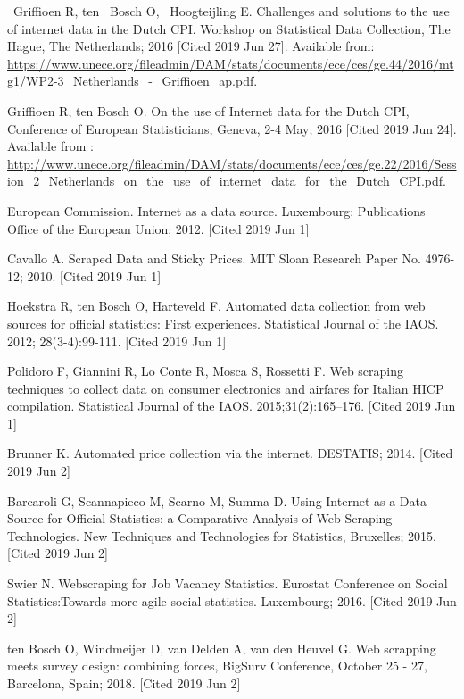 \documentclass[]{article}
\begin{document}
\begin{thebibliography}{99}
~Griffioen R, ten ~Bosch O, ~Hoogteijling E. Challenges and solutions to the use of internet data in the Dutch CPI. 
Workshop on Statistical Data Collection, The Hague, The Netherlands; 2016 [Cited 2019 Jun 27]. Available from: \url{https://www.unece.org/fileadmin/DAM/stats/documents/ece/ces/ge.44/2016/mtg1/WP2-3_Netherlands_-_Griffioen_ap.pdf}.

Griffioen R, ten Bosch O. On the use of Internet data for the Dutch CPI,
Conference of European Statisticians, Geneva, 2-4 May; 2016 [Cited 2019 Jun 24]. Available from : \url{http://www.unece.org/fileadmin/DAM/stats/documents/ece/ces/ge.22/2016/Session_2_Netherlands_on_the_use_of_internet_data_for_the_Dutch_CPI.pdf}.

European Commission. Internet as a data source. Luxembourg: Publications Office of the European Union; 2012. [Cited 2019 Jun 1]

Cavallo A. Scraped Data and Sticky Prices. MIT Sloan Research Paper No. 4976-12; 2010. [Cited 2019 Jun 1]

Hoekstra R, ten Bosch O, Harteveld F. Automated data collection from web sources for official statistics: First experiences. 
Statistical Journal of the IAOS. 2012; 28(3-4):99-111. [Cited 2019 Jun 1]

Polidoro F, Giannini R, Lo Conte R, Mosca S, Rossetti F. Web scraping techniques to collect data on consumer electronics and airfares for Italian HICP compilation. Statistical Journal of the IAOS. 2015;31(2):165–176. [Cited 2019 Jun 1]

Brunner K. Automated price collection via the internet. DESTATIS; 2014. [Cited 2019 Jun 2]

Barcaroli G, Scannapieco M, Scarno M, Summa D. Using Internet as a Data Source for Official Statistics: a Comparative Analysis of Web Scraping Technologies.
New Techniques and Technologies for Statistics, Bruxelles; 2015. [Cited 2019 Jun 2]

Swier N. Webscraping for Job Vacancy Statistics. Eurostat Conference on Social Statistics:Towards more agile social statistics. Luxembourg; 2016. [Cited 2019 Jun 2]

ten Bosch O, Windmeijer D, van Delden A, van den Heuvel G. Web scrapping meets survey design: combining forces,
BigSurv Conference, October 25 - 27, Barcelona, Spain; 2018. [Cited 2019 Jun 2]


\end{thebibliography}
\end{document}
